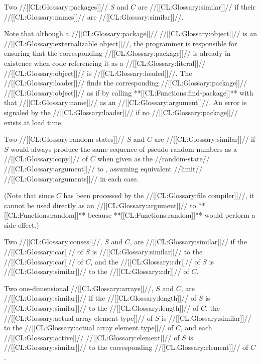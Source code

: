 
Two //[[CL:Glossary:packages]]// $S$ and $C$ are //[[CL:Glossary:similar]]// if their //[[CL:Glossary:names]]// are //[[CL:Glossary:similar]]//.

Note that although a //[[CL:Glossary:package]]// //[[CL:Glossary:object]]// is an //[[CL:Glossary:externalizable object]]//, the programmer is responsible for ensuring that the corresponding //[[CL:Glossary:package]]// is already in existence when code referencing it as a //[[CL:Glossary:literal]]// //[[CL:Glossary:object]]//  is //[[CL:Glossary:loaded]]//.  The //[[CL:Glossary:loader]]// finds the corresponding //[[CL:Glossary:package]]// //[[CL:Glossary:object]]// as if by calling **[[CL:Functions:find-package]]** with that //[[CL:Glossary:name]]// as an //[[CL:Glossary:argument]]//. An error is signaled by the //[[CL:Glossary:loader]]// if no //[[CL:Glossary:package]]// exists at load time.

  Two //[[CL:Glossary:random states]]// $S$ and $C$ are //[[CL:Glossary:similar]]// if $S$ would always produce the same sequence of pseudo-random numbers  as a //[[CL:Glossary:copy]]// of $C$ when given as the //random-state// //[[CL:Glossary:argument]]// to ,  assuming equivalent //limit// //[[CL:Glossary:arguments]]// in each case.

(Note that since $C$ has been processed by the //[[CL:Glossary:file compiler]]//, it cannot be used directly as an //[[CL:Glossary:argument]]// to **[[CL:Functions:random]]** because **[[CL:Functions:random]]** would perform a side effect.)


Two //[[CL:Glossary:conses]]//, $S$ and $C$, are //[[CL:Glossary:similar]]// if
    the //[[CL:Glossary:car]]// of $S$ is //[[CL:Glossary:similar]]// to the //[[CL:Glossary:car]]// of $C$, and the //[[CL:Glossary:cdr]]// of $S$ is //[[CL:Glossary:similar]]// to the //[[CL:Glossary:cdr]]// of $C$.


Two one-dimensional //[[CL:Glossary:arrays]]//, $S$ and $C$, are //[[CL:Glossary:similar]]// if
     the //[[CL:Glossary:length]]// of $S$ is //[[CL:Glossary:similar]]// to the //[[CL:Glossary:length]]// of $C$,
     the //[[CL:Glossary:actual array element type]]// of $S$ is //[[CL:Glossary:similar]]// to
     the //[[CL:Glossary:actual array element type]]// of $C$,
 and each //[[CL:Glossary:active]]// //[[CL:Glossary:element]]// of $S$ is //[[CL:Glossary:similar]]// to
      the corresponding //[[CL:Glossary:element]]// of $C$.

